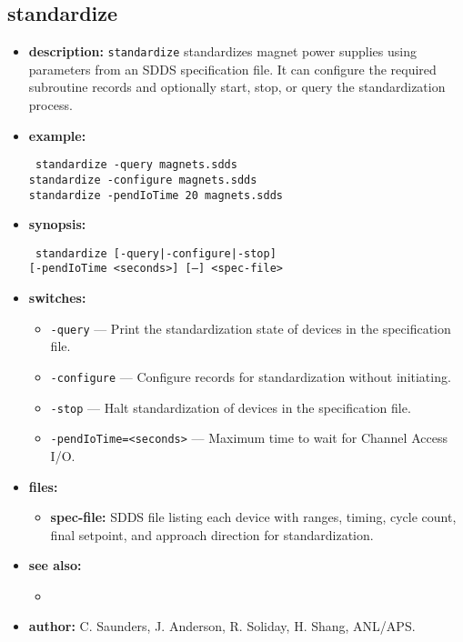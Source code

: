 \begin{latexonly}
\newpage
\end{latexonly}

\subsection{standardize}
\label{standardize}

\begin{itemize}
\item {\bf description:}
\verb+standardize+ standardizes magnet power supplies using parameters from an SDDS specification file.
It can configure the required subroutine records and optionally start, stop, or query the standardization process.

\item {\bf example:}
  \begin{flushleft}{\tt
    standardize -query magnets.sdds\\
    standardize -configure magnets.sdds\\
    standardize -pendIoTime 20 magnets.sdds
  }\end{flushleft}

\item {\bf synopsis:}
  \begin{flushleft}{\tt
    standardize [-query|-configure|-stop]\\
    \phantom{standardize }[-pendIoTime <seconds>] [--] <spec-file>
  }\end{flushleft}

\item {\bf switches:}
  \begin{itemize}
  \item {\tt -query} --- Print the standardization state of devices in the specification file.
  \item {\tt -configure} --- Configure records for standardization without initiating.
  \item {\tt -stop} --- Halt standardization of devices in the specification file.
  \item {\tt -pendIoTime=<seconds>} --- Maximum time to wait for Channel Access I/O.
  \end{itemize}

\item {\bf files:}
  \begin{itemize}
  \item {\bf spec-file:} SDDS file listing each device with ranges, timing, cycle count, final setpoint, and approach direction for standardization.
  \end{itemize}

\item {\bf see also:}
  \begin{itemize}
  \item {}
  \end{itemize}

\item {\bf author:} C. Saunders, J. Anderson, R. Soliday, H. Shang, ANL/APS.
\end{itemize}
